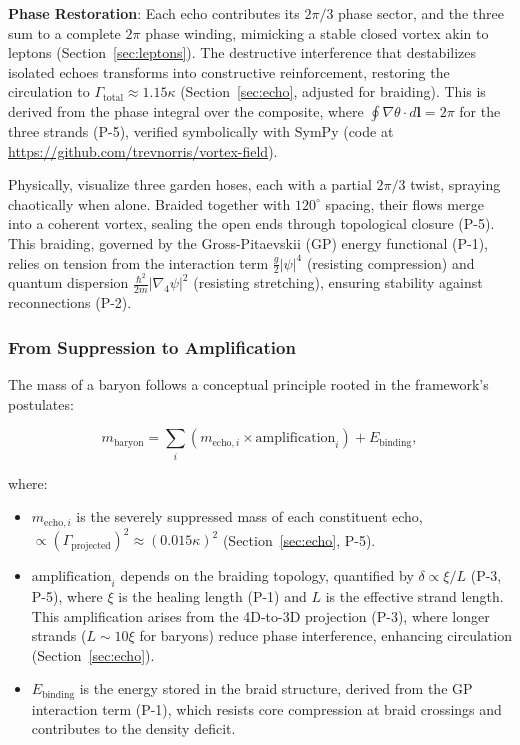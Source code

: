 \textbf{Phase Restoration}: Each echo contributes its $2\pi/3$ phase sector, and the three sum to a complete $2\pi$ phase winding, mimicking a stable closed vortex akin to leptons (Section~\ref{sec:leptons}). The destructive interference that destabilizes isolated echoes transforms into constructive reinforcement, restoring the circulation to $\Gamma_{\text{total}} \approx 1.15 \kappa$ (Section~\ref{sec:echo}, adjusted for braiding). This is derived from the phase integral over the composite, where $\oint \nabla \theta \cdot d\mathbf{l} = 2\pi$ for the three strands (P-5), verified symbolically with SymPy (code at \url{https://github.com/trevnorris/vortex-field}).

Physically, visualize three garden hoses, each with a partial $2\pi/3$ twist, spraying chaotically when alone. Braided together with $120^\circ$ spacing, their flows merge into a coherent vortex, sealing the open ends through topological closure (P-5). This braiding, governed by the Gross-Pitaevskii (GP) energy functional (P-1), relies on tension from the interaction term $\frac{g}{2} |\psi|^4$ (resisting compression) and quantum dispersion $\frac{\hbar^2}{2m} |\nabla_4 \psi|^2$ (resisting stretching), ensuring stability against reconnections (P-2).

\subsubsection{From Suppression to Amplification}

The mass of a baryon follows a conceptual principle rooted in the framework's postulates:

\[
m_{\text{baryon}} = \sum_i \left( m_{\text{echo},i} \times \text{amplification}_i \right) + E_{\text{binding}},
\]

where:
\begin{itemize}
\item $m_{\text{echo},i}$ is the severely suppressed mass of each constituent echo, $\propto (\Gamma_{\text{projected}})^2 \approx (0.015 \kappa)^2$ (Section~\ref{sec:echo}, P-5).
\item $\text{amplification}_i$ depends on the braiding topology, quantified by $\delta \propto \xi/L$ (P-3, P-5), where $\xi$ is the healing length (P-1) and $L$ is the effective strand length. This amplification arises from the 4D-to-3D projection (P-3), where longer strands ($L \sim 10 \xi$ for baryons) reduce phase interference, enhancing circulation (Section~\ref{sec:echo}).
\item $E_{\text{binding}}$ is the energy stored in the braid structure, derived from the GP interaction term (P-1), which resists core compression at braid crossings and contributes to the density deficit.
\end{itemize}

